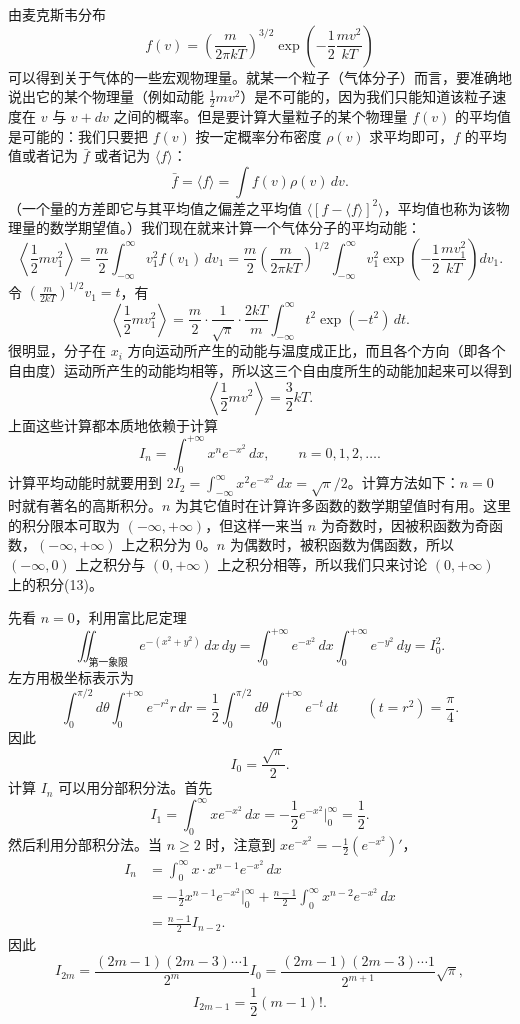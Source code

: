 由麦克斯韦分布
\begin{equation}
 f(v)=\left(\frac{m}{2\pi kT}\right)^{3/2}\exp\!\left(-\frac12\frac{mv^2}{kT}\right)
 \tag{12}
\end{equation}
可以得到关于气体的一些宏观物理量。就某一个粒子（气体分子）而言，要准确地说出它的某个物理量（例如动能 $\frac12mv^2$）是不可能的，因为我们只能知道该粒子速度在 $v$ 与 $v+dv$ 之间的概率。但是要计算大量粒子的某个物理量 $f(v)$ 的平均值是可能的：我们只要把 $f(v)$ 按一定概率分布密度 $\rho(v)$ 求平均即可，$f$ 的平均值或者记为 $\bar f$ 或者记为 $\langle f\rangle$：
\[
 \bar f=\langle f\rangle=\int f(v)\rho(v)\,dv.
\]
（一个量的方差即它与其平均值之偏差之平均值 $\langle[f-\langle f\rangle]^2\rangle$，平均值也称为该物理量的数学期望值。）我们现在就来计算一个气体分子的平均动能：
\[
 \left\langle\frac12mv_1^2\right\rangle
 =\frac m2\int_{-\infty}^{\infty}v_1^2f(v_1)\,dv_1
 =\frac m2\left(\frac m{2\pi kT}\right)^{1/2}
 \int_{-\infty}^{\infty}v_1^2\exp\!\left(-\frac12\frac{mv_1^2}{kT}\right)dv_1.
\]
令 $\left(\frac m{2kT}\right)^{1/2}v_1=t$，有
\[
 \left\langle\frac12mv_1^2\right\rangle
 =\frac m2\cdot\frac1{\sqrt\pi}\cdot\frac{2kT}{m}
 \int_{-\infty}^{\infty}t^2\exp(-t^2)\,dt.
\]
很明显，分子在 $x_i$ 方向运动所产生的动能与温度成正比，而且各个方向（即各个自由度）运动所产生的动能均相等，所以这三个自由度所生的动能加起来可以得到
\[
 \left\langle\frac12mv^2\right\rangle=\frac32kT.
\]
上面这些计算都本质地依赖于计算
\begin{equation}
 I_n=\int_0^{+\infty}x^ne^{-x^2}\,dx,\qquad n=0,1,2,\ldots.
 \tag{13}
\end{equation}
计算平均动能时就要用到 $2I_2=\int_{-\infty}^{\infty}x^2e^{-x^2}\,dx=\sqrt\pi/2$。计算方法如下：$n=0$ 时就有著名的高斯积分。$n$ 为其它值时在计算许多函数的数学期望值时有用。这里的积分限本可取为 $(-\infty,+\infty)$，但这样一来当 $n$ 为奇数时，因被积函数为奇函数，$(-\infty,+\infty)$ 上之积分为 0。$n$ 为偶数时，被积函数为偶函数，所以 $(-\infty,0)$ 上之积分与 $(0,+\infty)$ 上之积分相等，所以我们只来讨论 $(0,+\infty)$ 上的积分(13)。

先看 $n=0$，利用富比尼定理
\[
 \iint_{\text{第一象限}}e^{-(x^2+y^2)}\,dx\,dy
 =\int_0^{+\infty}e^{-x^2}\,dx\int_0^{+\infty}e^{-y^2}\,dy
 =I_0^2.
\]
左方用极坐标表示为
\[
 \int_0^{\pi/2}d\theta\int_0^{+\infty}e^{-r^2}r\,dr
 =\frac12\int_0^{\pi/2}d\theta\int_0^{+\infty}e^{-t}\,dt\qquad(t=r^2)
 =\frac\pi4.
\]
因此
\[
 I_0=\frac{\sqrt\pi}{2}.
\]
计算 $I_n$ 可以用分部积分法。首先
\[
 I_1=\int_0^\infty xe^{-x^2}\,dx=-\frac12e^{-x^2}\Big|_0^\infty=\frac12.
\]
然后利用分部积分法。当 $n\ge2$ 时，注意到 $xe^{-x^2}=-\frac12(e^{-x^2})'$，
\[
\begin{aligned}
 I_n
 &=\int_0^\infty x\cdot x^{n-1}e^{-x^2}\,dx\\
 &=-\frac12x^{n-1}e^{-x^2}\Big|_0^\infty
 +\frac{n-1}{2}\int_0^\infty x^{n-2}e^{-x^2}\,dx\\
 &=\frac{n-1}{2}I_{n-2}.
\end{aligned}
\]
因此
\[
 I_{2m}=\frac{(2m-1)(2m-3)\cdots1}{2^m}I_0
 =\frac{(2m-1)(2m-3)\cdots1}{2^{m+1}}\sqrt\pi,
\]
\begin{equation}
 I_{2m-1}=\frac12(m-1)!.
 \tag{14}
\end{equation}

